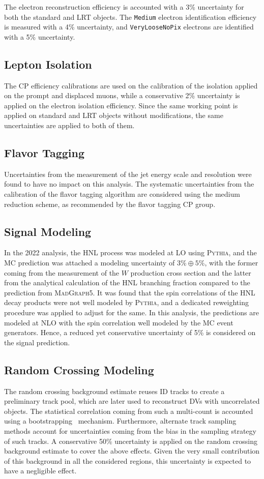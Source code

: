 The electron reconstruction efficiency is accounted with a 3\% uncertainty for both the standard and LRT objects. The \texttt{Medium} electron identification efficiency is measured with a 4\% uncertainty, and \texttt{VeryLooseNoPix} electrons are identified with a 5\% uncertainty.

\subsection*{Lepton Isolation}
The CP efficiency calibrations are used on the calibration of the isolation applied on the prompt and displaced muons, while a conservative 2\% uncertainty is applied on the electron isolation efficiency. Since the same working point is applied on standard and LRT objects without modifications, the same uncertainties are applied to both of them.

\subsection*{Flavor Tagging}
Uncertainties from the measurement of the jet energy scale and resolution were found to have no impact on this analysis. The systematic uncertainties from the calibration of the flavor tagging algorithm are considered using the medium reduction scheme, as recommended by the flavor tagging CP group.

\subsection*{Signal Modeling}
In the 2022 analysis, the HNL process was modeled at LO using \textsc{Pythia}, and the MC prediction was attached a modeling uncertainty of $3\% \oplus 5\%$, with the former coming from the measurement of the $W$ production cross section and the latter from the analytical calculation of the HNL branching fraction compared to the prediction from \textsc{MadGraph5}. It was found that the spin correlations of the HNL decay products were not well modeled by \textsc{Pythia}, and a dedicated reweighting procedure was applied to adjust for the same. In this analysis, the predictions are modeled at NLO with the spin correlation well modeled by the MC event generators. Hence, a reduced yet conservative uncertainty of 5\% is considered on the signal prediction.

\subsection*{Random Crossing Modeling}
The random crossing background estimate reuses ID tracks to create a preliminary track pool, which are later used to reconstruct DVs with uncorrelated objects. The statistical correlation coming from such a multi-count is accounted using a bootstrapping~\cite{ATL-PHYS-PUB-2021-011} mechanism. Furthermore, alternate track sampling methods account for uncertainties coming from the bias in the sampling strategy of such tracks. A conservative 50\% uncertainty is applied on the random crossing background estimate to cover the above effects. Given the very small contribution of this background in all the considered regions, this uncertainty is expected to have a negligible effect.

